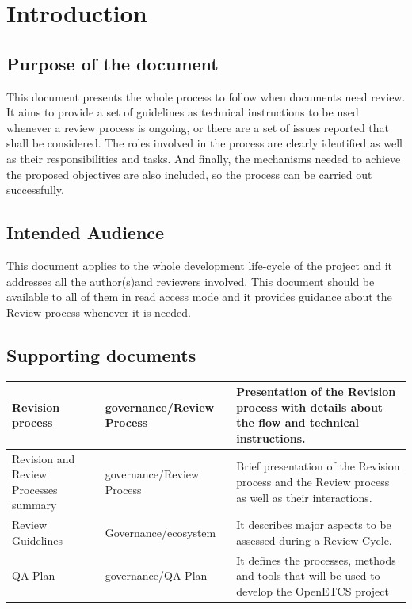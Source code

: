 \documentclass{template/openetcs_article}
\begin{document}
\newpage

\section{Introduction}

\subsection[Introduction]{Purpose of the document}
This document presents the whole process to follow when documents need review. It aims to provide a set of guidelines as technical instructions to be used whenever a review process is ongoing, or there are a set of issues reported that shall be considered. The roles involved in the process are clearly identified as well as their responsibilities and tasks. And finally, the mechanisms needed to achieve the proposed objectives are also included, so the process can be carried out successfully.

\subsection{Intended Audience}
This document applies to the whole development life-cycle of the project and it addresses all the author(s)and reviewers involved. This document should be available to all of them in read access mode and it provides guidance about the Review process whenever it is needed. 

\subsection{Supporting documents}
\tablehead{}
\tabletail{}
\tablelasttail{}
\begin{supertabular}{|m{3cm}m{3,5cm}m{7,5cm}|}
\hline
Revision process &
governance/Review Process &
Presentation of the Revision process with details about the flow and technical instructions.
\\\hline
Revision and Review Processes summary &
governance/Review Process &
Brief presentation of the Revision process and the Review process as well as their interactions.
\\\hline
Review Guidelines &
Governance/ecosystem &
It describes major aspects to be assessed during a Review Cycle.
\\\hline
QA Plan & governance/QA Plan & It defines the processes, methods and tools that will be used to develop the OpenETCS project
\\\hline
\end{supertabular}
\end{document}
